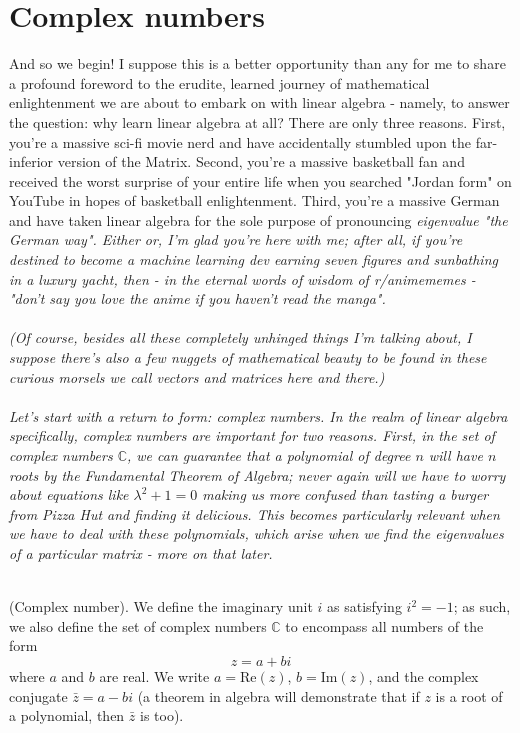 \documentclass{article}
\begin{document}
\section{Complex numbers}
And so we begin! I suppose this is a better opportunity than any for me to share a profound foreword to the erudite, learned journey of mathematical enlightenment we are about to embark on with linear algebra - namely, to answer the question: why learn linear algebra at all? There are only three reasons. First, you're a massive sci-fi movie nerd and have accidentally stumbled upon the far-inferior version of the Matrix. Second, you're a massive basketball fan and received the worst surprise of your entire life when you searched "Jordan form" on YouTube in hopes of basketball enlightenment. Third, you're a massive German and have taken linear algebra for the sole purpose of pronouncing \it eigenvalue \normalfont "the German way". Either or, I'm glad you're here with me; after all, if you're destined to become a machine learning dev earning seven figures and sunbathing in a luxury yacht, then - in the eternal words of wisdom of r/animememes - "don't say you love the anime if you haven't read the manga".
\\ \\
(Of course, besides all these completely unhinged things I'm talking about, I suppose there's also a few nuggets of mathematical beauty to be found in these curious morsels we call vectors and matrices here and there.) \\ \\
Let's start with a return to form: complex numbers. In the realm of linear algebra specifically, complex numbers are important for two reasons. First, in the set of complex numbers $\mathbb{C}$, we can guarantee that a polynomial of degree $n$ will have $n$ roots by the Fundamental Theorem of Algebra; never again will we have to worry about equations like $\lambda^2 + 1 =0$ making us more confused than tasting a burger from Pizza Hut and finding it delicious. This becomes particularly relevant when we have to deal with these polynomials, which arise when we find the eigenvalues of a particular matrix - more on that later. \\ \\
\begin{definition}
    (Complex number). We define the imaginary unit $i$ as satisfying $i^2 = -1$; as such, we also define the set of complex numbers $\mathbb{C}$ to encompass all numbers of the form 
    \begin{equation*}
        z=a+bi
    \end{equation*}
    where $a$ and $b$ are real. We write $a = \text{Re}(z)$, $b=\text{Im}(z)$, and the complex conjugate $\bar{z}=a-bi$ (a theorem in algebra will demonstrate that if $z$ is a root of a polynomial, then $\bar{z}$ is too).
\end{definition}
\end{document}
